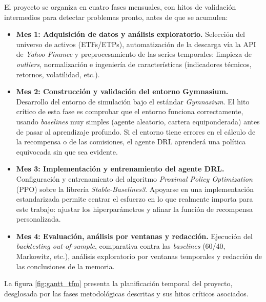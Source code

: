 \documentclass[IB,a4paper]{TFUOC}
\begin{document}
El proyecto se organiza en cuatro fases mensuales, con hitos de validación intermedios para detectar problemas pronto, antes de que se acumulen:

\begin{itemize}
    \item \textbf{Mes 1: Adquisición de datos y análisis exploratorio.}
    Selección del universo de activos (ETFs/ETPs), automatización de la descarga vía la API de \textit{Yahoo Finance} y preprocesamiento de las series temporales: limpieza de \textit{outliers}, normalización e ingeniería de características (indicadores técnicos, retornos, volatilidad, etc.).

    \item \textbf{Mes 2: Construcción y validación del entorno Gymnasium.}
    Desarrollo del entorno de simulación bajo el estándar \textit{Gymnasium}. El hito crítico de esta fase es comprobar que el entorno funciona correctamente, usando \textit{baselines} muy simples (agente aleatorio, cartera equiponderada) antes de pasar al aprendizaje profundo. Si el entorno tiene errores en el cálculo de la recompensa o de las comisiones, el agente DRL aprenderá una política equivocada sin que sea evidente.

    \item \textbf{Mes 3: Implementación y entrenamiento del agente DRL.}
    Configuración y entrenamiento del algoritmo \textit{Proximal Policy Optimization} (PPO) sobre la librería \textit{Stable-Baselines3}. Apoyarse en una implementación estandarizada permite centrar el esfuerzo en lo que realmente importa para este trabajo: ajustar los hiperparámetros y afinar la función de recompensa personalizada.

    \item \textbf{Mes 4: Evaluación, análisis por ventanas y redacción.}
    Ejecución del \textit{backtesting out-of-sample}, comparativa contra las \textit{baselines} (60/40, Markowitz, etc.), análisis exploratorio por ventanas temporales y redacción de las conclusiones de la memoria.
\end{itemize}

La figura \ref{fig:gantt_tfm} presenta la planificación temporal del proyecto, desglosada por las fases metodológicas descritas y sus hitos críticos asociados.
\end{document}
